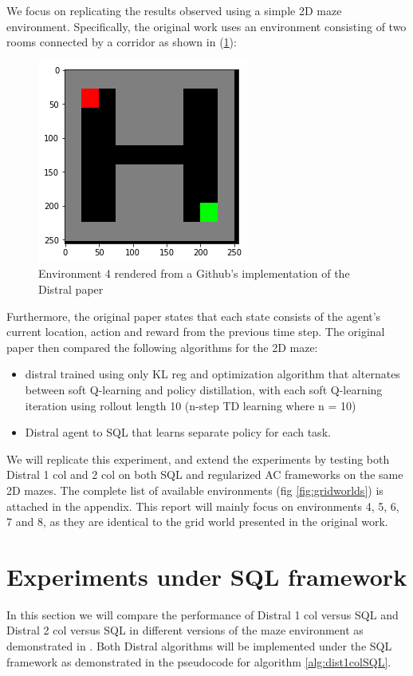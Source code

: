 \documentclass[12pt]{report}
\begin{document}
We focus on replicating the results observed using a simple 2D maze environment. Specifically, the original work \cite{teh2017distral} uses an environment consisting of two rooms connected by a corridor as shown in (\ref{fig4.1}):
\begin{figure}[H]
    \center
    \includegraphics[width=0.3\linewidth]{figs/grid4.png}
    \caption{Environment 4 rendered from a Github's \cite{alfredo_github} implementation of the Distral paper}
    \label{fig4.1}
\end{figure}
Furthermore, the original paper states that each state consists of the agent's current location, action and reward from the previous time step. The original paper then compared the following algorithms for the 2D maze:
\begin{itemize}
    \item distral trained using only KL reg and optimization algorithm that alternates between soft Q-learning and policy distillation, with each soft Q-learning iteration using rollout length 10 (n-step TD learning where n = 10)
    \item Distral agent to SQL that learns separate policy for each task.
\end{itemize}
We will replicate this experiment, and extend the experiments by testing both Distral 1 col and 2 col on both SQL and regularized AC frameworks on the same 2D mazes. The complete list of available environments (fig \ref{fig:gridworlds}) is attached in the appendix. This report will mainly focus on environments 4, 5, 6, 7 and 8, as they are identical to the grid world presented in the original work.

\section{Experiments under SQL framework}
In this section we will compare the performance of Distral 1 col versus SQL and Distral 2 col versus SQL in different versions of the maze environment as demonstrated in  \cite{teh2017distral}. Both Distral algorithms will be implemented under the SQL framework as demonstrated in the pseudocode for algorithm \ref{alg:dist1colSQL}.
\end{document}
